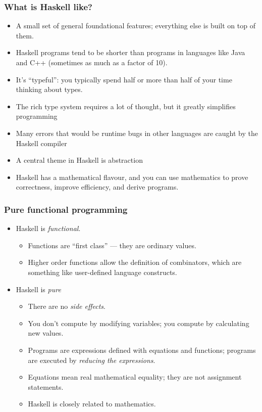 \documentclass{beamer}
\begin{document}
\begin{frame}
\frametitle{What is Haskell like?}

\begin{itemize}
\item A small set of general foundational features; everything
  else is built on top of them.
\item Haskell programs tend to be shorter than programs in
  languages like Java and C++ (sometimes as much as a factor of
  10).
\item It's ``typeful'': you typically spend half or more than half
  of your time thinking about types.
\item The rich type system requires a lot of thought, but it
  greatly simplifies programming
\item Many errors that would be runtime bugs in other languages are
  caught by the Haskell compiler
\item A central theme in Haskell is abstraction
\item Haskell has a mathematical flavour, and you can use
  mathematics to prove correctness, improve efficiency, and derive
  programs.
\end{itemize}

\end{frame}

\begin{frame}
\frametitle{Pure functional programming}

\begin{itemize}
\item Haskell is \emph{functional}.
  \begin{itemize}
  \item Functions are ``first class'' --- they are ordinary values.
  \item Higher order functions allow the definition of combinators,
    which are something like user-defined language constructs.
  \end{itemize}
\item Haskell is \emph{pure}
  \begin{itemize}
  \item There are no \emph{side effects}.
  \item You don't compute by modifying variables; you compute by
    calculating new values.
  \item Programs are expressions defined with equations and
    functions; programs are executed by \emph{reducing the
      expressions}.
  \item Equations mean real mathematical equality; they are not
    assignment statements.
  \item Haskell is closely related to mathematics.
  \end{itemize}
\end{itemize}

\end{frame}
\end{document}
